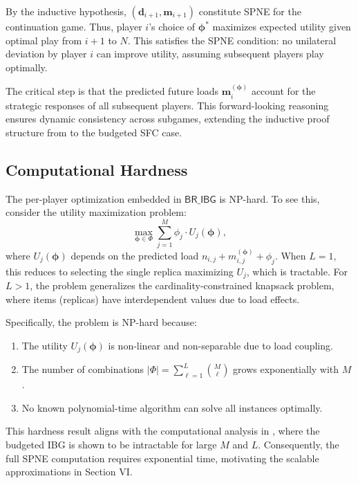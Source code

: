 \documentclass[journal]{IEEEtran}
\theoremstyle{plain}
\theoremstyle{definition}
\theoremstyle{remark}
\begin{document}
By the inductive hypothesis, $(\mathbf{d}_{i+1}, \mathbf{m}_{i+1})$ constitute SPNE for the continuation game. Thus, player $i$'s choice of $\boldsymbol{\phi}^*$ maximizes expected utility given optimal play from $i+1$ to $N$. This satisfies the SPNE condition: no unilateral deviation by player $i$ can improve utility, assuming subsequent players play optimally.

The critical step is that the predicted future loads $\mathbf{m}_i^{(\boldsymbol{\phi})}$ account for the strategic responses of all subsequent players. This forward-looking reasoning ensures dynamic consistency across subgames, extending the inductive proof structure from \cite{jiang2015indian, section IV} to the budgeted SFC case.

\subsection{Computational Hardness}
\label{app:proof_thm2_sec4}

The per-player optimization embedded in $\textsf{BR\_IBG}$ is NP-hard. To see this, consider the utility maximization problem:
\begin{equation}
\max_{\boldsymbol{\phi} \in \Phi} \sum_{j=1}^M \phi_j \cdot U_j(\boldsymbol{\phi}),
\end{equation}
where $U_j(\boldsymbol{\phi})$ depends on the predicted load $n_{i,j} + m_{i,j}^{(\boldsymbol{\phi})} + \phi_j$. When $L = 1$, this reduces to selecting the single replica maximizing $U_j$, which is tractable. For $L > 1$, the problem generalizes the cardinality-constrained knapsack problem, where items (replicas) have interdependent values due to load effects.

Specifically, the problem is NP-hard because:
\begin{enumerate}
    \item The utility $U_j(\boldsymbol{\phi})$ is non-linear and non-separable due to load coupling.
    \item The number of combinations $|\Phi| = \sum_{\ell=1}^L \binom{M}{\ell}$ grows exponentially with $M$.
    \item No known polynomial-time algorithm can solve all instances optimally.
\end{enumerate}

This hardness result aligns with the computational analysis in \cite{jiang2015indian, section IV}, where the budgeted IBG is shown to be intractable for large $M$ and $L$. Consequently, the full SPNE computation requires exponential time, motivating the scalable approximations in Section VI.
\end{document}
